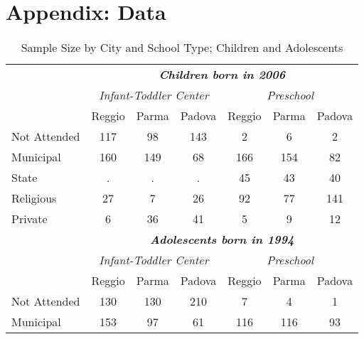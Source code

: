 \section{Appendix: Data} \label{app:data}
\begin{table}[ht]
\caption{Sample Size by City and School Type; Children and Adolescents}
\label{tab:sample-adol}

\begin{center}
\begin{tabular}{l ccc|ccc}
\hline\hline
 & \multicolumn{6}{c}{\textit{\textbf{Children born in 2006}}} \\ 
 & \multicolumn{3}{c}{\textit{Infant-Toddler Center}} & \multicolumn{3}{c}{\textit{Preschool}} \\ 
 & Reggio & Parma & Padova & Reggio & Parma & Padova \\ \hline
Not Attended    & 117 &  98 & 143 &   2 &   6 &   2 \\ 
Municipal       & 160 & 149 &  68 & 166 & 154 &  82 \\ 
State           &   . &   . &   . &  45 &  43 &  40 \\ 
Religious       &  27 &   7 &  26 &  92 &  77 & 141 \\ 
Private         &   6 &  36 &  41 &   5 &   9 &  12 \\ \hline 
%
%
\rule{0pt}{1.2\normalbaselineskip}
 & \multicolumn{6}{c}{\textit{\textbf{Adolescents born in 1994}}} \\ 

 & \multicolumn{3}{c}{\textit{Infant-Toddler Center}} & \multicolumn{3}{c}{\textit{Preschool}} \\ 

 & Reggio & Parma & Padova & Reggio & Parma & Padova \\ \hline
Not Attended    & 130 & 130 & 210 &   7 &   4 &   1 \\ 
Municipal       & 153 &  97 &  61 & 116 & 116 &  93 \\ 




\end{tabular}
\end{center}
\end{table}
